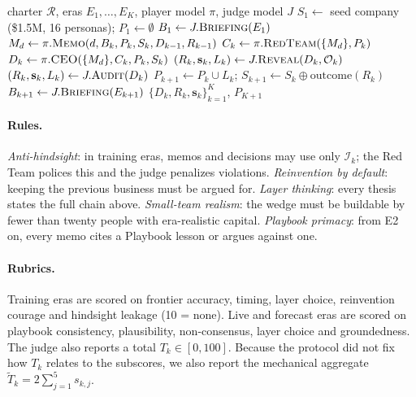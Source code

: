 \documentclass[11pt]{article}
\theoremstyle{definition}
\newcommand{\sys}{\textsc{Frontier Autolab}}
\begin{document}
\begin{algorithm}[t]
\caption{One \sys{} trajectory}
\label{alg:loop}
\small
\begin{algorithmic}[1]
\Require charter $\mathcal{R}$, eras $E_1,\dots,E_K$, player model $\pi$, judge model $J$
\State $S_1 \gets$ seed company (\$1.5M, 16 personas); $P_1 \gets \emptyset$
\State $B_1 \gets J.\textsc{Briefing}(E_1)$ 
    \State $M_d \gets \pi.\textsc{Memo}(d, B_k, P_k, S_k, D_{k-1}, R_{k-1})$ 
  \EndFor
  \State $C_k \gets \pi.\textsc{RedTeam}(\{M_d\}, P_k)$
  \State $D_k \gets \pi.\textsc{CEO}(\{M_d\}, C_k, P_k, S_k)$
    \State $(R_k, \mathbf{s}_k, L_k) \gets J.\textsc{Reveal}(D_k, \mathcal{O}_k)$
  \Else
    \State $(R_k, \mathbf{s}_k, L_k) \gets J.\textsc{Audit}(D_k)$ 
  \EndIf
  \State $P_{k+1} \gets P_k \cup L_k$; \quad $S_{k+1} \gets S_k \oplus \text{outcome}(R_k)$
  \State $B_{k+1} \gets J.\textsc{Briefing}(E_{k+1})$
\EndFor
\State \Return $\{D_k, R_k, \mathbf{s}_k\}_{k=1}^{K}$, $P_{K+1}$
\end{algorithmic}
\end{algorithm}

\paragraph{Rules.} \emph{Anti-hindsight}: in training eras, memos and decisions may use only $\mathcal{I}_k$; the Red Team polices this and the judge penalizes violations. \emph{Reinvention by default}: keeping the previous business must be argued for. \emph{Layer thinking}: every thesis states the full chain above. \emph{Small-team realism}: the wedge must be buildable by fewer than twenty people with era-realistic capital. \emph{Playbook primacy}: from E2 on, every memo cites a Playbook lesson or argues against one.

\paragraph{Rubrics.} Training eras are scored on frontier accuracy, timing, layer choice, reinvention courage and hindsight leakage (10 = none). Live and forecast eras are scored on playbook consistency, plausibility, non-consensus, layer choice and groundedness. The judge also reports a total $T_k\in[0,100]$. Because the protocol did not fix how $T_k$ relates to the subscores, we also report the mechanical aggregate $\tilde{T}_k=2\sum_{j=1}^{5}s_{k,j}$.
\end{document}
